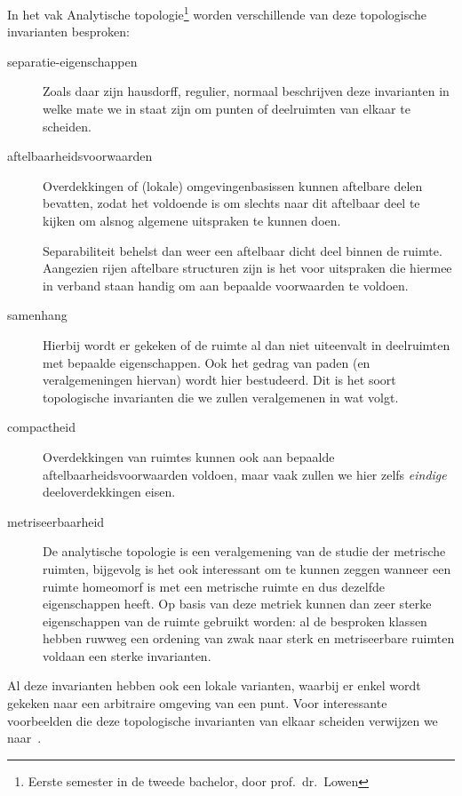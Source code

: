 \documentclass[a4paper,11pt]{article}
\begin{document}
In het vak Analytische topologie\footnote{Eerste semester in de tweede bachelor, door prof.~dr.~Lowen} worden verschillende van deze topologische invarianten besproken:
\begin{description}
  \item[separatie-eigenschappen] Zoals daar zijn hausdorff, regulier, normaal beschrijven deze invarianten in welke mate we in staat zijn om punten of deelruimten van elkaar te scheiden. 

  \item[aftelbaarheidsvoorwaarden] Overdekkingen of (lokale) omgevingenbasissen kunnen aftelbare delen bevatten, zodat het voldoende is om slechts naar dit aftelbaar deel te kijken om alsnog algemene uitspraken te kunnen doen.
    
    Separabiliteit behelst dan weer een aftelbaar dicht deel binnen de ruimte. Aangezien rijen aftelbare structuren zijn is het voor uitspraken die hiermee in verband staan handig om aan bepaalde voorwaarden te voldoen.
    
  \item[samenhang] Hierbij wordt er gekeken of de ruimte al dan niet uiteenvalt in deelruimten met bepaalde eigenschappen. Ook het gedrag van paden (en veralgemeningen hiervan) wordt hier bestudeerd. Dit is het soort topologische invarianten die we zullen veralgemenen in wat volgt.

  \item[compactheid] Overdekkingen van ruimtes kunnen ook aan bepaalde aftelbaarheidsvoorwaarden voldoen, maar vaak zullen we hier zelfs \emph{eindige} deeloverdekkingen eisen. 

  \item[metriseerbaarheid] De analytische topologie is een veralgemening van de studie der metrische ruimten, bijgevolg is het ook interessant om te kunnen zeggen wanneer een ruimte homeomorf is met een metrische ruimte en dus dezelfde eigenschappen heeft. Op basis van deze metriek kunnen dan zeer sterke eigenschappen van de ruimte gebruikt worden: al de besproken klassen hebben ruwweg een ordening van zwak naar sterk en metriseerbare ruimten voldaan een sterke invarianten.
\end{description}

Al deze invarianten hebben ook een lokale varianten, waarbij er enkel wordt gekeken naar een arbitraire omgeving van een punt. Voor interessante voorbeelden die deze topologische invarianten van elkaar scheiden verwijzen we naar~\cite{counterexamples-in-topology}.
\vspace{1em}
\end{document}
